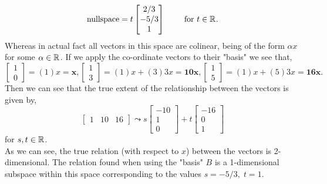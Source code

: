 \documentclass[MathsNotesBase.tex]{subfiles}
\begin{document}
{{\[		\text{nullspace} =
		t\begin{bmatrix}
			2/3\\
			-5/3\\
			1
		\end{bmatrix} \hspace{20pt} \text{ for } t \in \mathbb{R}^{}.
	\]
	Whereas in actual fact all vectors in this space are colinear, being of the form ${ \alpha x }$ for some ${ \alpha \in \mathbb{R}^{} }$. If we apply the co-ordinate vectors to their "basis" we see that,
	\[ \begin{bmatrix}1\\0\end{bmatrix} = (1)x = \bm{x}, \begin{bmatrix}1\\3\end{bmatrix} = (1)x + (3)3x = \bm{10x}, \begin{bmatrix}1\\5\end{bmatrix} = (1)x + (5)3x = \bm{16x}. \]
	Then we can see that the true extent of the relationship between the vectors is given by,
	\[ \begin{bmatrix}1 & 10 & 16\end{bmatrix} \leadsto s \begin{bmatrix}-10\\1\\0\end{bmatrix} + t \begin{bmatrix}-16\\0\\1\end{bmatrix} \]
	for ${ s,t \in \mathbb{R}^{} }$.\\
	As we can see, the true relation (with respect to $x$) between the vectors is 2-dimensional. The relation found when using the "basis" $B$ is a 1-dimensional subspace within this space corresponding to the values ${ s = -5/3,\; t = 1 }$.
	}
	
	\biggerskip


}
\end{document}

